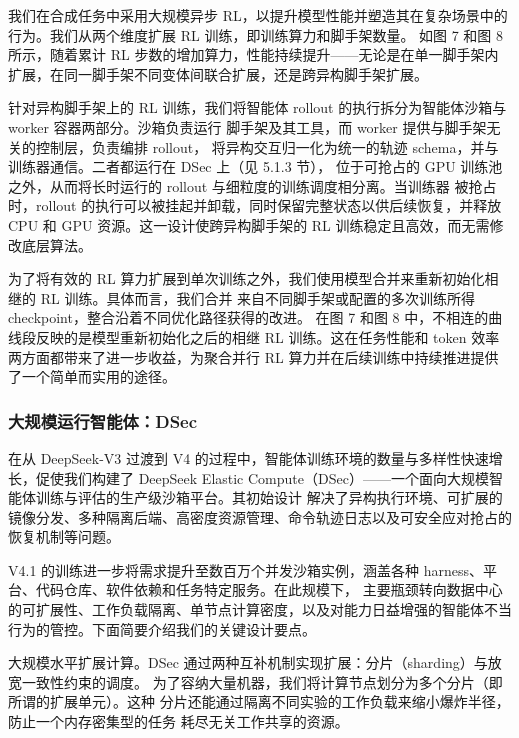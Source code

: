 \documentclass[
  10
]{article}
\begin{document}
我们在合成任务中采用大规模异步 RL，以提升模型性能并塑造其在复杂场景中的行为。我们从两个维度扩展 RL 训练，即训练算力和脚手架数量。
如图 7 和图 8 所示，随着累计 RL 步数的增加算力，性能持续提升——无论是在单一脚手架内扩展，在同一脚手架不同变体间联合扩展，还是跨异构脚手架扩展。

针对异构脚手架上的 RL 训练，我们将智能体 rollout 的执行拆分为智能体沙箱与 worker 容器两部分。沙箱负责运行
脚手架及其工具，而 worker 提供与脚手架无关的控制层，负责编排 rollout，
将异构交互归一化为统一的轨迹 schema，并与训练器通信。二者都运行在 DSec 上（见 5.1.3 节），
位于可抢占的 GPU 训练池之外，从而将长时运行的 rollout 与细粒度的训练调度相分离。当训练器
被抢占时，rollout 的执行可以被挂起并卸载，同时保留完整状态以供后续恢复，并释放 CPU 和 GPU
资源。这一设计使跨异构脚手架的 RL 训练稳定且高效，而无需修改底层算法。





为了将有效的 RL 算力扩展到单次训练之外，我们使用模型合并来重新初始化相继的 RL 训练。具体而言，我们合并
来自不同脚手架或配置的多次训练所得 checkpoint，整合沿着不同优化路径获得的改进。
在图 7 和图 8 中，不相连的曲线段反映的是模型重新初始化之后的相继 RL 训练。这在任务性能和
token 效率两方面都带来了进一步收益，为聚合并行 RL 算力并在后续训练中持续推进提供了一个简单而实用的途径。

\subsubsection{大规模运行智能体：DSec}\label{running-agents-at-massive-scale-dsec}

在从 DeepSeek-V3 过渡到 V4 的过程中，智能体训练环境的数量与多样性快速增长，促使我们构建了 DeepSeek Elastic Compute（DSec）——一个面向大规模智能体训练与评估的生产级沙箱平台。其初始设计
解决了异构执行环境、可扩展的镜像分发、多种隔离后端、高密度资源管理、命令轨迹日志以及可安全应对抢占的恢复机制等问题。

V4.1 的训练进一步将需求提升至数百万个并发沙箱实例，涵盖各种
harness、平台、代码仓库、软件依赖和任务特定服务。在此规模下，
主要瓶颈转向数据中心的可扩展性、工作负载隔离、单节点计算密度，以及对能力日益增强的智能体不当行为的管控。下面简要介绍我们的关键设计要点。





大规模水平扩展计算。DSec 通过两种互补机制实现扩展：分片（sharding）与放宽一致性约束的调度。
为了容纳大量机器，我们将计算节点划分为多个分片（即所谓的扩展单元）。这种
分片还能通过隔离不同实验的工作负载来缩小爆炸半径，防止一个内存密集型的任务
耗尽无关工作共享的资源。
\end{document}

